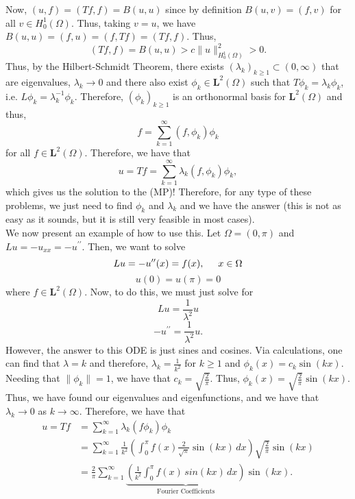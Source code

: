 \documentclass[12pt]{article}
\newcommand{\pp}{\prime\prime}
\newcommand{\Om}{\Omega}
\newcommand{\sumk}{\sum\limits_{k = 1}^{\infty}}
\newcommand{\dint}{\displaystyle\int}
\newcommand{\dintopi}{\dint_{0}^{\pi}}
\newcommand{\ml}{\mathbf{L}}
\newcommand{\sbs}{\subset}
\newcommand{\Hzo}{H_0^1(\Om)}
\newcommand{\mlto}{\ml^2(\Om)}
\begin{document}
\indent Now, $(u, f) = (Tf, f) = B(u, u)$ since by definition $B(u, v) = (f, v)$ for all $v \in \Hzo$. Thus, taking $v = u$, we have $B(u, u) = (f, u) = (f, Tf) = (Tf, f)$. Thus, 
\[ (Tf, f) = B(u, u) > c \| u \|_{\Hzo}^2 > 0.\]
Thus, by the Hilbert-Schmidt Theorem, there exists $(\lambda_k)_{k \geq 1} \sbs (0, \infty)$ that are eigenvalues, $\lambda_k \to 0$ and there also exist $\phi_k \in \mlto$ such that $T \phi_k = \lambda_k \phi_k$, i.e. $L \phi_k = \lambda_k^{-1} \phi_k$. Therefore, $(\phi_k)_{k \geq 1}$ is an orthonormal basis for $\mlto$ and thus, 
\[ f = \sumk (f, \phi_k) \phi_k\]
for all $f \in \mlto$. Therefore, we have that 
\begin{equation}
u = Tf = \sumk \lambda_k (f, \phi_k) \phi_k,
\end{equation}
which gives us the solution to the (MP)! Therefore, for any type of these problems, we just need to find $\phi_k$ and $\lambda_k$ and we have the answer (this is not as easy as it sounds, but it is still very feasible in most cases).\\
\indent We now present an example of how to use this. Let $\Om = (0, \pi)$ and $Lu = -u_{xx} = - u^{\prime\prime}$. Then, we want to solve
\[Lu = -u^{\pp} (x) = f(x), \hspace{5mm} x \in \Om \]
\[ u(0) = u(\pi) = 0\]
where $f \in \mlto$. Now, to do this, we must just solve for 
\[ Lu = \frac{1}{\lambda^2} u\]
\[- u^{\pp} = \frac{1}{\lambda^2} u.\]
However, the answer to this ODE is just sines and cosines. Via calculations, one can find that $\lambda = k$ and therefore, $\lambda_k = \frac{1}{k^2}$ for $k \geq 1$ and $\phi_k(x) = c_k \sin(kx)$. Needing that $\| \phi_k \| = 1$, we have that $c_k = \sqrt{\frac{2}{\pi}}$. Thus, $\phi_k(x) = \sqrt{\frac{2}{\pi}} \sin(kx)$. Thus, we have found our eigenvalues and eigenfunctions, and we have that $\lambda_k \to 0$ as $k \to \infty$. Therefore, we have that 
\begin{align*}
u = Tf & = \sumk \lambda_k (f \phi_k) \phi_k \\
& = \sumk \frac{1}{k^2} \left( \dintopi f(x) \frac{2}{\sqrt{\pi}} \sin(kx) \, dx\right) \sqrt{\frac{2}{\pi}} \sin(kx) \\
& = \frac{2}{\pi} \sumk \underbrace{\left( \frac{1}{k^2} \dintopi f(x) \, sin(kx) \, dx \right)}_{\text{Fourier Coefficients}} \sin(kx).
\end{align*}
\end{document}
